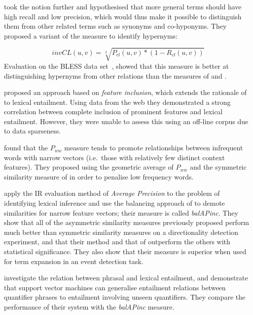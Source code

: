 \documentclass[11pt]{article}
\begin{document}
 took the notion further and hypothesised that more general terms should have high recall and low precision, which would thus make it possible to distinguish them from other related terms such as synonyms and co-hyponyms.  They proposed a variant of the  measure to identify hypernyms:

\[
invCL(u,v) = \sqrt[2]{P_{cl}(u,v)*(1-R_{cl}(u,v))}
\]
Evaluation on the BLESS data set~\cite{Baroni2011}, showed that this measure is  better at distinguishing hypernyms from other relations than the measures of  and .

 proposed an approach based on \emph{feature inclusion}, which extends the rationale of~ to lexical entailment. Using data from the web they demonstrated a strong correlation between complete inclusion of prominent features and lexical entailment. However, they were unable to assess this using an off-line corpus due to data sparseness.

 found that the $P_{ww}$ measure tends to promote relationships between infrequent words with narrow vectors (i.e.~those with relatively few distinct context features).  They proposed using the geometric average of $P_{ww}$ and the symmetric similarity measure of  in order to penalise low frequency words.   

 apply the IR evaluation method of \emph{Average Precision} to the problem of identifying lexical inference and use the balancing approach of  to demote similarities for narrow feature vectors; their measure is called \emph{balAPinc}.  They show that all of the asymmetric similarity measures previously proposed perform much better than symmetric similarity measures on a directionality detection experiment, and that their method and that of  outperform the others with statistical significance. They also show that their measure is superior when used for term expansion in an event detection task.

 investigate the relation between phrasal and
lexical entailment, and demonstrate that support vector machines can
generalise entailment relations between quantifier phrases to
entailment involving unseen quantifiers. They compare the performance
of their system with the \emph{balAPinc} measure.
\end{document}
